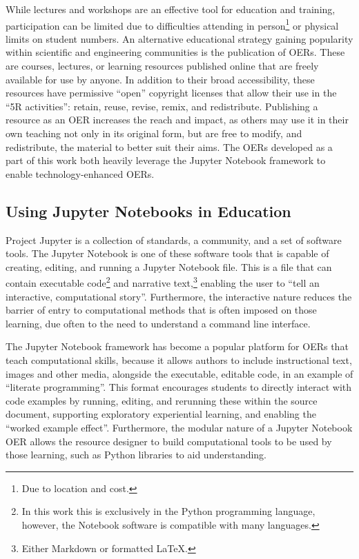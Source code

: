 While lectures and workshops are an effective tool for education and training, participation can be limited due to difficulties attending in person\footnote{Due to location and cost.} or physical limits on student numbers.
An alternative educational strategy gaining popularity within scientific and engineering communities is the publication of OERs.
These are courses, lectures, or learning resources published online that are freely available for use by anyone.
In addition to their broad accessibility, these resources have permissive ``open'' copyright licenses that allow their use in the ``5R activities'': retain, reuse, revise, remix, and redistribute.
Publishing a resource as an OER increases the reach and impact, as others may use it in their own teaching not only in its original form, but are free to modify, and redistribute, the material to better suit their aims.
The OERs developed as a part of this work both heavily leverage the Jupyter Notebook framework to enable technology-enhanced OERs.

\subsection{Using Jupyter Notebooks in Education}
Project Jupyter is a collection of standards, a community, and a set of software tools.
The Jupyter Notebook is one of these software tools that is capable of creating, editing, and running a Jupyter Notebook file.
This is a file that can contain executable code\footnote{In this work this is exclusively in the Python programming language, however, the Notebook software is compatible with many languages.} and narrative text,\footnote{Either Markdown or formatted \LaTeX.} enabling the user to ``tell an interactive, computational story''.
Furthermore, the interactive nature reduces the barrier of entry to computational methods that is often imposed on those learning, due often to the need to understand a command line interface.

The Jupyter Notebook framework has become a popular platform for OERs that teach computational skills, because it allows authors to include instructional text, images and other media, alongside the executable, editable code, in an example of ``literate programming''.
This format encourages students to directly interact with code examples by running, editing, and rerunning these within the source document, supporting exploratory experiential learning, and enabling the ``worked example effect''.
Furthermore, the modular nature of a Jupyter Notebook OER allows the resource designer to build computational tools to be used by those learning, such as Python libraries to aid understanding.

